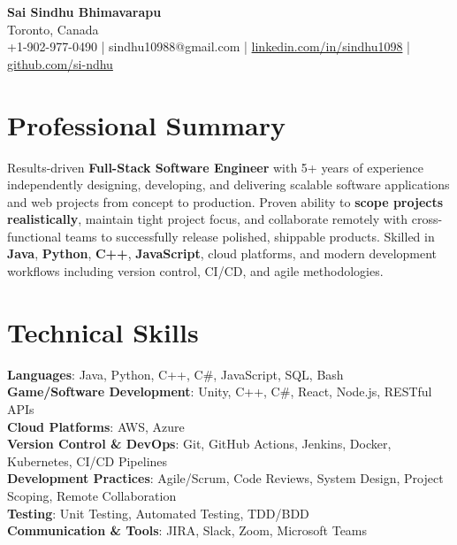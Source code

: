 \documentclass[letterpaper,11pt]{article}
\begin{document}
\begin{center}
  {\Large \textbf{Sai Sindhu Bhimavarapu}} \\
  Toronto, Canada \\
  +1-902-977-0490 \enspace | \enspace sindhu10988@gmail.com \enspace | \enspace \href{https://www.linkedin.com/in/sindhu1098/}{linkedin.com/in/sindhu1098} \enspace | \enspace \href{https://github.com/si-ndhu}{github.com/si-ndhu}
\end{center}

\section{Professional Summary}
  \begin{itemize}[leftmargin=0.15in, label={}]
    \small{\item{
     Results-driven \textbf{Full-Stack Software Engineer} with 5+ years of experience independently designing, developing, and delivering scalable software applications and web projects from concept to production. Proven ability to \textbf{scope projects realistically}, maintain tight project focus, and collaborate remotely with cross-functional teams to successfully release polished, shippable products. Skilled in \textbf{Java}, \textbf{Python}, \textbf{C++}, \textbf{JavaScript}, cloud platforms, and modern development workflows including version control, CI/CD, and agile methodologies.
    }}
  \end{itemize}
\vspace{-16pt}

\section{Technical Skills}
 \begin{itemize}[leftmargin=0.15in, label={}]
    \small{\item{
     \textbf{Languages}: Java, Python, C++, C\#, JavaScript, SQL, Bash \\
     \textbf{Game/Software Development}: Unity, C++, C\#, React, Node.js, RESTful APIs \\
     \textbf{Cloud Platforms}: AWS, Azure \\
     \textbf{Version Control \& DevOps}: Git, GitHub Actions, Jenkins, Docker, Kubernetes, CI/CD Pipelines \\
     \textbf{Development Practices}: Agile/Scrum, Code Reviews, System Design, Project Scoping, Remote Collaboration \\
     \textbf{Testing}: Unit Testing, Automated Testing, TDD/BDD \\
     \textbf{Communication \& Tools}: JIRA, Slack, Zoom, Microsoft Teams
    }}
 \end{itemize}
\vspace{-16pt}
\end{document}
